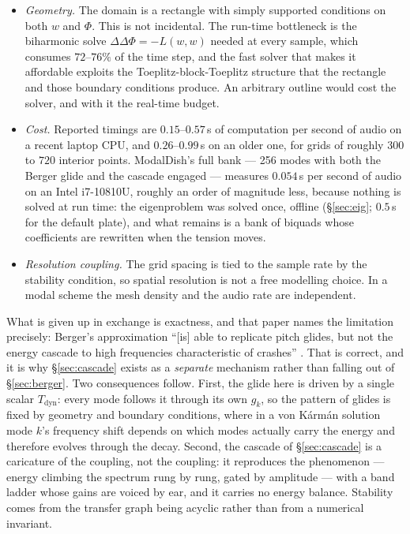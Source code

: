 \documentclass[11pt,a4paper]{article}
\begin{document}
\begin{itemize}
\item \emph{Geometry.} The domain is a rectangle with simply supported
  conditions on both $w$ and $\Phi$. This is not incidental. The run-time
  bottleneck is the biharmonic solve $\Delta\Delta\Phi = -L(w,w)$ needed at
  every sample, which consumes $72$--$76\%$ of the time step, and the fast
  solver that makes it affordable \cite{wang-puckette} exploits the
  Toeplitz-block-Toeplitz structure that the rectangle and those boundary
  conditions produce. An arbitrary outline would cost the solver, and with
  it the real-time budget.
\item \emph{Cost.} Reported timings are $0.15$--$0.57$\,s of computation per
  second of audio on a recent laptop CPU, and $0.26$--$0.99$\,s on an older
  one, for grids of roughly $300$ to $720$ interior points. ModalDish's full
  bank --- 256
  modes with both the Berger glide and the cascade engaged --- measures
  $0.054$\,s per second of audio on an Intel i7-10810U, roughly an order of
  magnitude less, because nothing is solved at run time: the eigenproblem
  was solved once, offline (\S\ref{sec:eig}; $0.5$\,s for the default
  plate), and what remains is a bank of biquads whose coefficients are
  rewritten when the tension moves.
\item \emph{Resolution coupling.} The grid spacing is tied to the sample
  rate by the stability condition, so spatial resolution is not a free
  modelling choice. In a modal scheme the mesh density and the audio rate
  are independent.
\end{itemize}

What is given up in exchange is exactness, and that paper names the
limitation precisely: Berger's approximation ``[is] able to replicate pitch
glides, but not the energy cascade to high frequencies characteristic of
crashes'' \cite{bilbao-gong23}. That is correct, and it is why
\S\ref{sec:cascade} exists as a \emph{separate} mechanism rather than
falling out of \S\ref{sec:berger}. Two consequences follow. First, the
glide here is driven by a single scalar $T_{\mathrm{dyn}}$: every mode
follows it through its own $g_k$, so the pattern of glides is fixed by
geometry and boundary conditions, where in a von K\'arm\'an solution mode
$k$'s frequency shift depends on which modes actually carry the energy and
therefore evolves through the decay. Second, the cascade of
\S\ref{sec:cascade} is a caricature of the coupling, not the coupling: it
reproduces the phenomenon --- energy climbing the spectrum rung by rung,
gated by amplitude --- with a band ladder whose gains are voiced by ear,
and it carries no energy balance. Stability comes from the transfer graph
being acyclic rather than from a numerical invariant.
\end{document}
